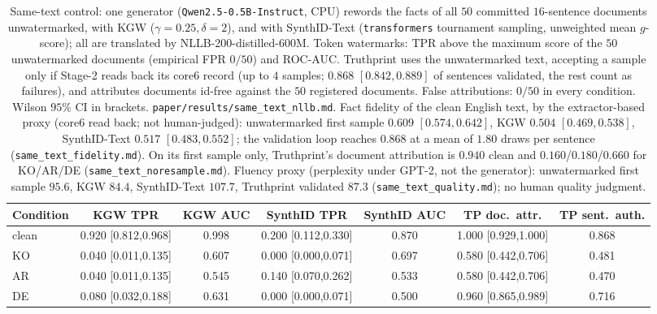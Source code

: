 \documentclass[journal]{IEEEtran}
\begin{document}
\begin{table}[t]
\centering
\caption{Same-text control: one generator (\texttt{Qwen2.5-0.5B-Instruct}, CPU)
rewords the facts of all $50$ committed $16$-sentence documents unwatermarked, with
KGW ($\gamma{=}0.25,\delta{=}2$), and with SynthID-Text (\texttt{transformers}
tournament sampling, unweighted mean $g$-score); all are translated by
NLLB-200-distilled-600M. Token watermarks: TPR above the maximum score of the
$50$ unwatermarked documents (empirical FPR $0/50$) and ROC-AUC. Truthprint uses
the unwatermarked text, accepting a sample only if Stage-2 reads back its core6
record (up to $4$ samples; $0.868$ $[0.842,0.889]$ of sentences validated, the
rest count as failures), and attributes documents id-free against the $50$
registered documents. False attributions: $0/50$ in every condition. Wilson
$95\%$ CI in brackets. \texttt{paper/results/same\_text\_nllb.md}. Fact fidelity of the clean
English text, by the extractor-based proxy (core6 read back; not human-judged):
unwatermarked first sample $0.609$ $[0.574,0.642]$, KGW $0.504$ $[0.469,0.538]$,
SynthID-Text $0.517$ $[0.483,0.552]$; the validation loop reaches $0.868$ at a
mean of $1.80$ draws per sentence (\texttt{same\_text\_fidelity.md}). On its first sample only, Truthprint's document attribution is $0.940$ clean and $0.160$/$0.180$/$0.660$ for KO/AR/DE (\texttt{same\_text\_noresample.md}). Fluency proxy (perplexity under GPT-2, not the generator): unwatermarked first sample $95.6$, KGW $84.4$, SynthID-Text $107.7$, Truthprint validated $87.3$ (\texttt{same\_text\_quality.md}); no human quality judgment.}
\label{tab:sametext}
\scriptsize
\setlength{\tabcolsep}{3pt}
\begin{tabular}{lcccccc}
\toprule
Condition & KGW TPR & KGW AUC & SynthID TPR & SynthID AUC & TP doc.\ attr. & TP sent.\ auth. \\
\midrule
clean & 0.920 [0.812,0.968] & 0.998 & 0.200 [0.112,0.330] & 0.870 & 1.000 [0.929,1.000] & 0.868 \\
KO & 0.040 [0.011,0.135] & 0.607 & 0.000 [0.000,0.071] & 0.697 & 0.580 [0.442,0.706] & 0.481 \\
AR & 0.040 [0.011,0.135] & 0.545 & 0.140 [0.070,0.262] & 0.533 & 0.580 [0.442,0.706] & 0.470 \\
DE & 0.080 [0.032,0.188] & 0.631 & 0.000 [0.000,0.071] & 0.500 & 0.960 [0.865,0.989] & 0.716 \\
\bottomrule
\end{tabular}
\end{table}
\end{document}
